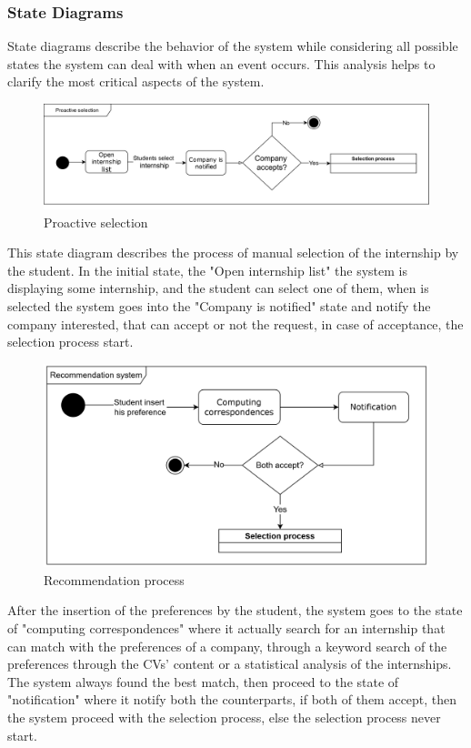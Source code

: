 \subsubsection{State Diagrams}
State diagrams describe the behavior of the system while considering all possible states the system can deal with when an event occurs. This analysis helps to clarify the most critical aspects of the system.
\begin{figure}[H]
    \centering
    \includegraphics[width=\textwidth]{Images/Proactive selection.png}
    \caption{Proactive selection}
    \label{Proactive selection}
\end{figure}
This state diagram describes the process of manual selection of the internship by the student. In the initial state, the "Open internship list" the system is displaying some internship, and the student can select one of them, when is selected the system goes into the "Company is notified" state and notify the company interested, that can accept or not the request, in case of acceptance, the selection process start. 
\begin{figure}[H]
    \centering
    \includegraphics[width=\textwidth]{Images/Recommendation system.png}
    \caption{Recommendation process}
    \label{Recommendetion system}
\end{figure}
After the insertion of the preferences by the student, the system goes to the state of "computing correspondences" where it actually search for an internship that can match with the preferences of a company, through a keyword search of the preferences through the CVs' content or a statistical analysis of the internships. The system always found the best match, then proceed to the state of "notification" where it notify both the counterparts, if both of them accept, then the system proceed with the selection process, else the selection process never start.
